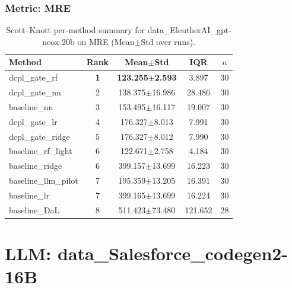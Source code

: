 \subsubsection*{Metric: MRE}
\begin{table}[H]
\centering
\scriptsize
\setlength{\tabcolsep}{4pt}
\renewcommand{\arraystretch}{1.1}
\caption{Scott--Knott per-method summary for data\_EleutherAI\_gpt-neox-20b on MRE (Mean$\pm$Std over runs).}
\label{tab:sk_data_EleutherAI_gpt-neox-20b_MRE}
\begin{tabular}{l|c|c|c|c}
\hline
\textbf{Method} & \textbf{Rank} & \textbf{Mean$\pm$Std} & \textbf{IQR} & \textbf{$n$} \\
\hline
\rowcolor{red!15} dcpl\_gate\_rf & \textbf{1} & \textbf{123.255$\pm$2.593} & 3.897 & 30 \\
dcpl\_gate\_nn & 2 & 138.375$\pm$16.986 & 28.486 & 30 \\
baseline\_nn & 3 & 153.495$\pm$16.117 & 19.007 & 30 \\
dcpl\_gate\_lr & 4 & 176.327$\pm$8.013 & 7.991 & 30 \\
dcpl\_gate\_ridge & 5 & 176.327$\pm$8.012 & 7.990 & 30 \\
baseline\_rf\_light & 6 & 122.671$\pm$2.758 & 4.184 & 30 \\
baseline\_ridge & 6 & 399.157$\pm$13.699 & 16.223 & 30 \\
baseline\_llm\_pilot & 7 & 195.359$\pm$13.205 & 16.391 & 30 \\
baseline\_lr & 7 & 399.165$\pm$13.699 & 16.224 & 30 \\
baseline\_DaL & 8 & 511.423$\pm$73.480 & 121.652 & 28 \\
\hline
\end{tabular}
\end{table}


\newpage

\section*{LLM: data\_Salesforce\_codegen2-16B}

